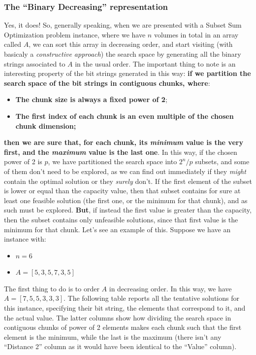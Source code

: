 \documentclass[12pt]{extarticle}
\begin{document}
\subsubsection{The ``Binary Decreasing'' representation}
Yes, it does! So, generally speaking, when we are presented with a Subset Sum Optimization problem instance, where we have $n$ volumes in total in an array called $A$, we can sort this array in decreasing order, and start visiting (with basicaly a \emph{constructive approach}) the search space by generating all the binary strings associated to $A$ in the usual order.\newline
The important thing to note is an interesting property of the bit strings generated in this way: \textbf{if we partition the search space of the bit strings in contiguous chunks, where}:
\begin{itemize}
    \item \textbf{The chunk size is always a fixed power of 2};
    \item \textbf{The first index of each chunk is an even multiple of the chosen chunk dimension;}
\end{itemize}
\textbf{then we are sure that, for each chunk, its \emph{minimum} value is the very first, and the \emph{maximum} value is the last one}. In this way, if the chosen power of 2 is $p$, we have partitioned the search space into $2^{n} / p$ subsets, and some of them don't need to be explored, as we can find out immediately if they \emph{might} contain the optimal solution or they \emph{surely} don't. If the first element of the subset is lower or equal than the capacity value, then that subset contains for sure at least one feasible solution (the first one, or the minimum for that chunk), and as such must be explored. \textbf{But}, if instead the first value is greater than the capacity, then the subset contains only unfeasible solutions, since that first value is the minimum for that chunk.
\newline
Let's see an example of this. Suppose we have an instance with:
\begin{itemize}
    \item $n = 6$
    \item $A = [5, 3, 5, 7, 3, 5]$
\end{itemize}
The first thing to do is to order $A$ in decreasing order. In this way, we have $A = [7, 5, 5, 3, 3, 3]$. The following table reports all the tentative solutions for this instance, specifying their bit string, the elements that correspond to it, and the actual value. The latter columns show how dividing the search space in contiguous chunks of power of 2 elements makes each chunk such that the first element is the minimum, while the last is the maximum (there isn't any ``Distance 2'' column as it would have been identical to the ``Value'' column).
\end{document}
